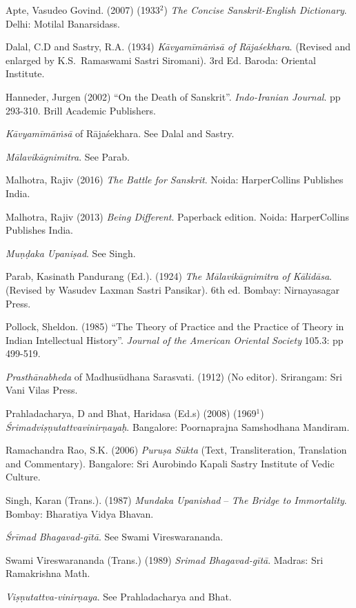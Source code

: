 \begin{thebibliography}{99}
\itemsep=2pt
Apte, Vasudeo Govind. (2007) (1933$^{2}$) \textsl{The Concise Sanskrit-English Dictionary}. Delhi: Motilal Banarsidass.

Dalal, C.D and Sastry, R.A. (1934) \textsl{Kāvyamīmāṁsā of Rājaśekhara}. (Revised and enlarged by K.S.~Ramaswami Sastri Siromani). 3rd Ed. Baroda: Oriental Institute.

Hanneder, Jurgen (2002) ``On the Death of Sanskrit''. \textsl{Indo-Iranian Journal}. pp 293-310. Brill Academic Publishers. 

\textsl{Kāvyamīmāṁsā} of Rājaśekhara. See Dalal and Sastry. 

\textsl{Mālavikāgnimitra}. See Parab. 

Malhotra, Rajiv (2016) \textsl{The Battle for Sanskrit}. Noida: HarperCollins Publishes India.

Malhotra, Rajiv (2013) \textsl{Being Different}. Paperback edition. Noida: HarperCollins Publishes India.

\textsl{Muṇḍaka Upaniṣad}. See Singh. 

Parab, Kasinath Pandurang (Ed.). (1924) \textsl{The Mālavikāgnimitra of Kālidāsa}. (Revised by Wasudev Laxman Sastri Pansikar). 6th ed. Bombay: Nirnayasagar Press.

Pollock, Sheldon. (1985) ``The Theory of Practice and the Practice of Theory in Indian Intellectual History''. \textsl{Journal of the American Oriental Society} 105.3: pp 499-519.

{\it Prasthānabheda} of Madhusūdhana Sarasvati. (1912) (No editor). Srirangam: Sri Vani Vilas Press.

Prahladacharya, D and Bhat, Haridasa (Ed.s) (2008) (1969$^{1}$) \textsl{Śrimadviṣṇutattvavinirṇayaḥ}. Bangalore: Poornaprajna Samshodhana Mandiram.

Ramachandra Rao, S.K. (2006) \textsl{Puruṣa Sūkta} (Text, Transliteration, Translation and Commentary). Bangalore: Sri Aurobindo Kapali Sastry Institute of Vedic Culture. 

Singh, Karan (Trans.). (1987) \textsl{Mundaka Upanishad} -- \textsl{The Bridge to Immortality}. Bombay: Bharatiya Vidya Bhavan.

\textsl{Śrīmad Bhagavad-gītā}. See Swami Vireswarananda. 

Swami Vireswarananda (Trans.) (1989) \textsl{Srimad Bhagavad-gītā}. Madras: Sri Ramakrishna Math.

\textsl{Viṣṇutattva-vinirṇaya}. See Prahladacharya and Bhat.
\end{thebibliography}
